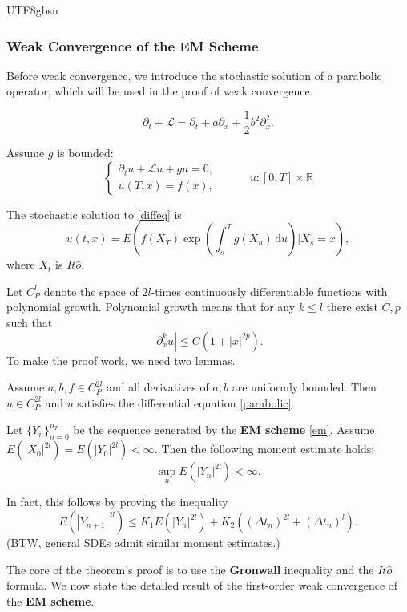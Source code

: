 \documentclass{article}
\begin{document}
\begin{CJK*}{UTF8}{gbsn}
\subsubsection{Weak Convergence of the EM Scheme}
Before weak convergence, we introduce the stochastic solution of a parabolic operator, which will be used in the proof of weak convergence.
\begin{definition}
    $$
    \partial_t+\mathcal{L}=\partial_t+a\partial_x+\frac{1}{2}b^2\partial_x^2.
    $$
\end{definition}

\begin{definition}
Assume $g$ is bounded:
    $$
    \begin{cases}
        \partial_tu+\mathcal{L}u+gu=0,&\\
        u(T,x)=f(x),&
    \end{cases}
    \qquad
    u:[0,T]\times\mathbb{R}\label{parabolic}
    $$
\end{definition}

\begin{lemma}
The stochastic solution to \ref{diffeq} is
    $$
    u(t,x)=E\left(f(X_T)\exp\left(\int_s^Tg(X_u)\,\mathrm{d}u\right)\Bigg|X_s=x\right),
    $$
    where $X_t$ is $It\hat{o}$.
\end{lemma}
Let $C_P^{l}$ denote the space of $2l$-times continuously differentiable functions with polynomial growth. Polynomial growth means that for any $k\le l$ there exist $C,p$ such that
$$
|\partial_x^k u|\le C(1+|x|^{2p}).
$$
To make the proof work, we need two lemmas.

\begin{lemma}
    Assume $a,b,f\in C_P^{2l}$ and all derivatives of $a,b$ are uniformly bounded. Then $u\in C_P^{2l}$ and $u$ satisfies the differential equation \ref{parabolic}.
\end{lemma}

\begin{lemma}
Let $\{Y_n\}_{n=0}^{n_T}$ be the sequence generated by the \textbf{EM scheme} \ref{em}. Assume $E(|X_0|^{2l})=E(|Y_0|^{2l})<\infty$. Then the following moment estimate holds:
    $$\sup_n E(|Y_{n}|^{2l})<\infty.$$
\end{lemma}
In fact, this follows by proving the inequality
$$
E(|Y_{n+1}|^{2l})\le K_1E(|Y_{n}|^{2l})+K_2\left((\Delta t_n)^{2l}+(\Delta t_n)^{l}\right).
$$
(BTW, general SDEs admit similar moment estimates.)

The core of the theorem’s proof is to use the \textbf{Gronwall} inequality and the $It\hat{o}$ formula. We now state the detailed result of the first-order weak convergence of the \textbf{EM scheme}.


\end{CJK*}
\end{document}
